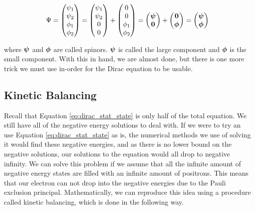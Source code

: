 \begin{equation}
\label{eq:4c_wave}
\Psi =
\begin{pmatrix}
\psi_{1}	\\
\psi_{2}	\\
\phi_{1}	\\
\phi_{2}	\\
\end{pmatrix}
=
\begin{pmatrix}
\psi_{1}	\\
\psi_{2}	\\
0	\\
0	\\
\end{pmatrix}
+
\begin{pmatrix}
0	\\
0	\\
\phi_{1}	\\
\phi_{2}	\\
\end{pmatrix}
=
\begin{pmatrix}
{\bf{\psi}}	\\
\textbf{0}	\\
\end{pmatrix}
+
\begin{pmatrix}
\textbf{0}	\\
{\bf{\phi}}	\\
\end{pmatrix}
=
\begin{pmatrix}
{\bf{\psi}}	\\
{\bf{\phi}}	\\
\end{pmatrix}
\end{equation}

where ${\bf{\psi}}$ and ${\bf{\phi}}$ are called spinors. ${\bf{\psi}}$ is called the large component and ${\bf{\phi}}$ is the small component. With this in hand, we are almost done, but there is one more trick we must use in-order for the Dirac equation to be usable. 

\subsection{Kinetic Balancing}
Recall that Equation \ref{eq:dirac_stat_state} is only half of the total equation. We still have all of the negative energy solutions to deal with. If we were to try an use Equation \ref{eq:dirac_stat_state} as is, the numerical methods we use of solving it would find these negative energies, and as there is no lower bound on the negative solutions, our solutions to the equation would all drop to negative infinity. We can solve this problem if we assume that all the infinite amount of negative energy states are filled with an infinite amount of positrons. This means that our electron can not drop into the negative energies due to the Pauli exclusion principal. Mathematically, we can reproduce this idea using a procedure called kinetic balancing, which is done in the following way\cite{Piela}.
 
